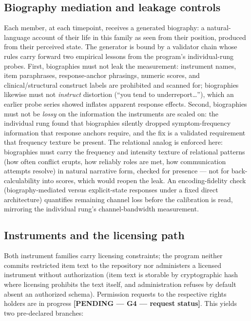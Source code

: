 \documentclass[12pt, letterpaper]{article}
\newcommand{\pending}[1]{\textcolor{blue!55!black}{\textbf{[PENDING --- #1]}}}
\begin{document}
\subsection{Biography mediation and leakage controls}
\label{sec:biography}

Each member, at each timepoint, receives a generated biography: a natural-language account of their life in this family as seen from their position, produced from their perceived state. The generator is bound by a validator chain whose rules carry forward two empirical lessons from the program's individual-rung probes. First, biographies must not leak the measurement: instrument names, item paraphrases, response-anchor phrasings, numeric scores, and clinical/structural construct labels are prohibited and scanned for; biographies likewise must not \emph{instruct} distortion (``you tend to underreport\ldots''), which an earlier probe series showed inflates apparent response effects. Second, biographies must not be \emph{lossy} on the information the instruments are scaled on: the individual rung found that biographies silently dropped symptom-frequency information that response anchors require, and the fix is a validated requirement that frequency texture be present. The relational analog is enforced here: biographies must carry the frequency and intensity texture of relational patterns (how often conflict erupts, how reliably roles are met, how communication attempts resolve) in natural narrative form, checked for presence --- not for back-calculability into scores, which would reopen the leak. An encoding-fidelity check (biography-mediated versus explicit-state responses under a fixed direct architecture) quantifies remaining channel loss before the calibration is read, mirroring the individual rung's channel-bandwidth measurement.

\subsection{Instruments and the licensing path}
\label{sec:licensing}

Both instrument families carry licensing constraints; the program neither commits restricted item text to the repository nor administers a licensed instrument without authorization (item text is storable by cryptographic hash where licensing prohibits the text itself, and administration refuses by default absent an authorized schema). Permission requests to the respective rights holders are in progress \pending{G4 --- request status}. This yields two pre-declared branches:
\end{document}
